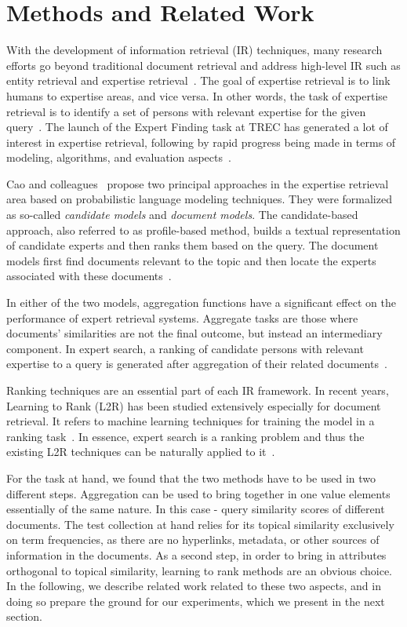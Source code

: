 \section{Methods and Related Work}
\label{sec:methods}
With the development of information retrieval (IR) techniques, many research efforts go beyond traditional document retrieval and address high-level IR such as entity retrieval and expertise retrieval~\cite{er-sparse}. The goal of expertise retrieval is to link humans to expertise areas, and vice versa. In other words, the task of expertise retrieval is to identify a set of persons with relevant expertise for the given query~\cite{er,er-community-aware}.
The launch of the Expert Finding task at TREC has generated a lot of interest in expertise retrieval, following by rapid progress being made in terms of modeling, algorithms, and evaluation aspects~\cite{trec2005,er-community-aware}.

Cao and colleagues~\cite{trec2005} propose two principal approaches  in the expertise retrieval area based on probabilistic language modeling techniques. They were formalized as so-called \textit{candidate models} and \textit{document models}. The candidate-based approach, also referred to as profile-based method, builds a textual representation of candidate experts and then ranks them based on the query. The document models first find documents relevant to the topic and then locate the experts associated with these documents~\cite{er}.

In either of the two models, aggregation functions have a significant effect on the performance of expert retrieval systems. Aggregate tasks are those where documents' similarities are not
the final outcome, but instead an intermediary component. In expert search, a ranking of candidate persons with relevant expertise to a query is generated after aggregation of their related documents~\cite{agg-learning}.

Ranking techniques are an essential part of each IR framework. In recent years, Learning to Rank (L2R) has been studied extensively especially for document retrieval. It refers to machine learning techniques for training the model in a ranking task~\cite{er}. In essence, expert search is a ranking problem and thus the existing L2R techniques can be naturally applied to it~\cite{l2r-intro}.

For the task at hand, we found that the two methods have to be used in two different steps. Aggregation can be used to bring together in one value elements essentially of the same nature. In this case - query similarity scores of different documents. The test collection at hand relies for its topical similarity exclusively on term frequencies, as there are no hyperlinks, metadata, or other sources of information in the documents. As a second step, in order to bring in attributes orthogonal to topical similarity, learning to rank methods are an obvious choice. In the following, we describe related work related to these two aspects, and in doing so prepare the ground for our experiments, which we present in the next section.

